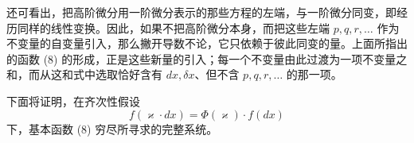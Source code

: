 还可看出，把高阶微分用一阶微分表示的那些方程的左端，与一阶微分同变，即经历同样的线性变换。因此，如果不把高阶微分本身，而把这些左端 \(p,q,r,\ldots\) 作为不变量的自变量引入，那么撇开导数不论，它只依赖于彼此同变的量。上面所指出的函数 (8) 的形成，正是这些新量的引入；每一个不变量由此过渡为一项不变量之和，而从这和式中选取恰好含有 \(dx,\delta x\)、但不含 \(p,q,r,\ldots\) 的那一项。

下面将证明，在齐次性假设
\[
f(\varkappa\cdot dx)=\Phi(\varkappa)\cdot f(dx)
\]
下，基本函数 (8) 穷尽所寻求的完整系统。

